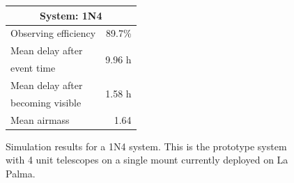 \begin{colsection}
\begin{colsection}
\begin{figure}[p]
\begin{center}
\begin{minipage}[t]{0.35\textwidth}
\begin{tabular}{lr}
\multicolumn{2}{c}{\textbf{System: 1N4}} \\
\midrule
Observing efficiency & 89.7\% \\
\midrule
Mean delay after     & \multirow{2}{*}{9.96 h} \\
event time           & \\
Mean delay after     & \multirow{2}{*}{1.58 h} \\
becoming visible     & \\
\midrule
Mean airmass         & 1.64 \\
\end{tabular}
\vfill
\end{minipage}

\end{center}
\caption[Simulation results: 1N4 system]{Simulation results for a 1N4 system. This is the prototype system with 4 unit telescopes on a single mount currently deployed on La Palma.
}
\label{fig:sim_1n4}
\end{figure}


\begin{figure}[p]
\begin{center}


\end{center}
\end{figure}
\end{colsection}
\end{colsection}
